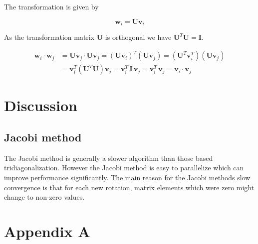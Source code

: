\documentclass[a4paper, fontsize=11pt]{article}
\begin{document}
The transformation is given by

\begin{equation}
\textbf{w}_{i} = \textbf{U} \textbf{v}_{i}
\end{equation}

As the transformation matrix \textbf{U} is orthogonal we have $\textbf{U}^{T}\textbf{U} = \textbf{I}$.

\begin{align*}
\textbf{w}_{i} \cdot \textbf{w}_{j} & =\textbf{U} \textbf{v}_{j} \cdot \textbf{U} \textbf{v}_{j} = (\textbf{U}\textbf{v}_{i})^{T}(\textbf{U}\textbf{v}_{j})=(\textbf{U}^{T} \textbf{v}_{i}^{T})(\textbf{U}\textbf{v}_{j})\\
&= \textbf{v}_{i}^{T} (\textbf{U}^{T} \textbf{U}) \textbf{v}_{j}= \textbf{v}_{i}^{T} \, \textbf{I} \, \textbf{v}_{j} =  \textbf{v}_{i}^{T} \,  \textbf{v}_{j} = \textbf{v}_{i} \cdot \textbf{v}_{j}
\end{align*}




\section{Discussion}
\subsection{Jacobi method}
The Jacobi method is generally a slower algorithm than those based tridiagonalization. However the Jacobi method is easy to parallelize which can improve performance significantly. The main reason for the Jacobi methods slow convergence is that for each new rotation, matrix elements which were zero might change to non-zero values.


\section{Appendix A}

\newpage


\end{document}
